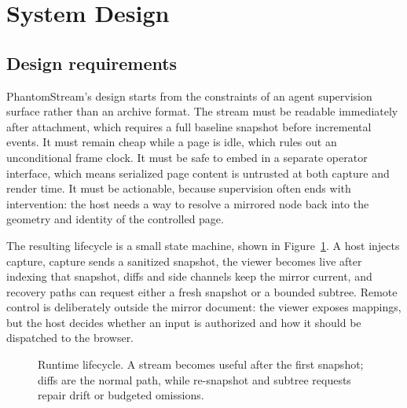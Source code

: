\documentclass[conference]{IEEEtran}
\begin{document}
\section{System Design}

\subsection{Design requirements}

PhantomStream's design starts from the constraints of an agent supervision
surface rather than an archive format. The stream must be readable immediately
after attachment, which requires a full baseline snapshot before incremental
events. It must remain cheap while a page is idle, which rules out an unconditional
frame clock. It must be safe to embed in a separate operator interface, which
means serialized page content is untrusted at both capture and render time. It
must be actionable, because supervision often ends with intervention: the host
needs a way to resolve a mirrored node back into the geometry and identity of
the controlled page.

The resulting lifecycle is a small state machine, shown in
Figure~\ref{fig:lifecycle}. A host injects capture, capture sends a sanitized
snapshot, the viewer becomes live after indexing that snapshot, diffs and side
channels keep the mirror current, and recovery paths can request either a fresh
snapshot or a bounded subtree. Remote control is deliberately outside the mirror
document: the viewer exposes mappings, but the host decides whether an input is
authorized and how it should be dispatched to the browser.

\begin{figure}[t]
\centering
{}
\caption{Runtime lifecycle. A stream becomes useful after the first snapshot;
diffs are the normal path, while re-snapshot and subtree requests repair drift or
budgeted omissions.}
\label{fig:lifecycle}
\end{figure}
\end{document}
